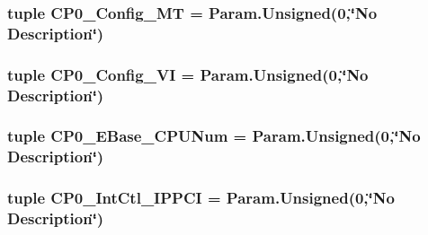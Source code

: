 \label{classMipsCPU_1_1BaseMipsCPU_a6893a0c5c82cdbd1a26d85c8110c96c3}
\hypertarget{classMipsCPU_1_1BaseMipsCPU_ae4391661b7a034779ebd497450a311f3}{
\subsubsection[{CP0\_\-Config\_\-MT}]{\setlength{\rightskip}{0pt plus 5cm}tuple {\bf CP0\_\-Config\_\-MT} = Param.Unsigned(0,\char`\"{}No Description\char`\"{})}}
\label{classMipsCPU_1_1BaseMipsCPU_ae4391661b7a034779ebd497450a311f3}
\hypertarget{classMipsCPU_1_1BaseMipsCPU_aa8b9aabfdafafc150995737ab0f9ed58}{
\subsubsection[{CP0\_\-Config\_\-VI}]{\setlength{\rightskip}{0pt plus 5cm}tuple {\bf CP0\_\-Config\_\-VI} = Param.Unsigned(0,\char`\"{}No Description\char`\"{})}}
\label{classMipsCPU_1_1BaseMipsCPU_aa8b9aabfdafafc150995737ab0f9ed58}
\hypertarget{classMipsCPU_1_1BaseMipsCPU_ac7fa3f0a56c696086600092a77169097}{
\subsubsection[{CP0\_\-EBase\_\-CPUNum}]{\setlength{\rightskip}{0pt plus 5cm}tuple {\bf CP0\_\-EBase\_\-CPUNum} = Param.Unsigned(0,\char`\"{}No Description\char`\"{})}}
\label{classMipsCPU_1_1BaseMipsCPU_ac7fa3f0a56c696086600092a77169097}
\hypertarget{classMipsCPU_1_1BaseMipsCPU_a6f5844a5323d4b093567bba00d5e8185}{
\subsubsection[{CP0\_\-IntCtl\_\-IPPCI}]{\setlength{\rightskip}{0pt plus 5cm}tuple {\bf CP0\_\-IntCtl\_\-IPPCI} = Param.Unsigned(0,\char`\"{}No Description\char`\"{})}}
